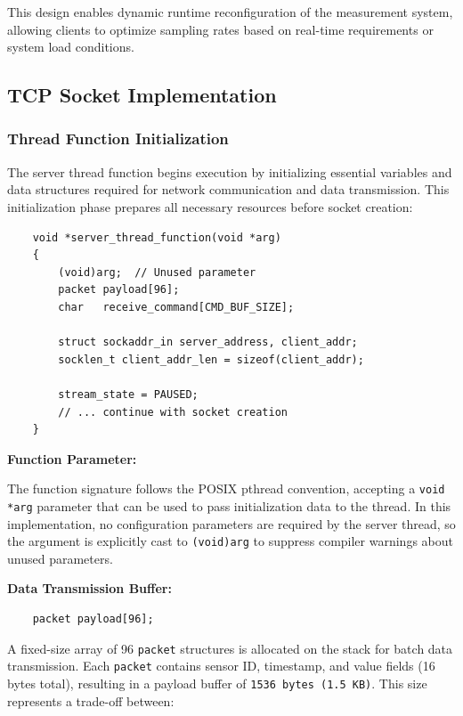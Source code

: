 This design enables dynamic runtime reconfiguration of the measurement system, allowing clients to optimize sampling rates based on real-time requirements or system load conditions.



\subsection{TCP Socket Implementation}

\subsubsection{Thread Function Initialization}

The server thread function begins execution by initializing essential variables and data structures required for network communication and data transmission. This initialization phase prepares all necessary resources before socket creation:

\begin{verbatim}
	void *server_thread_function(void *arg)
	{
		(void)arg;  // Unused parameter
		packet payload[96];
		char   receive_command[CMD_BUF_SIZE];
		
		struct sockaddr_in server_address, client_addr;
		socklen_t client_addr_len = sizeof(client_addr);
		
		stream_state = PAUSED;
		// ... continue with socket creation
	}
\end{verbatim}

\textbf{Function Parameter:}

The function signature follows the POSIX pthread convention, accepting a \texttt{void *arg} parameter that can be used to pass initialization data to the thread. In this implementation, no configuration parameters are required by the server thread, so the argument is explicitly cast to \texttt{(void)arg} to suppress compiler warnings about unused parameters.

\textbf{Data Transmission Buffer:}

\begin{verbatim}
	packet payload[96];
\end{verbatim}

A fixed-size array of 96 \texttt{packet} structures is allocated on the stack for batch data transmission. Each \texttt{packet} contains sensor ID, timestamp, and value fields (16 bytes total), resulting in a payload buffer of \texttt{1536 bytes (1.5 KB)}. This size represents a trade-off between:

